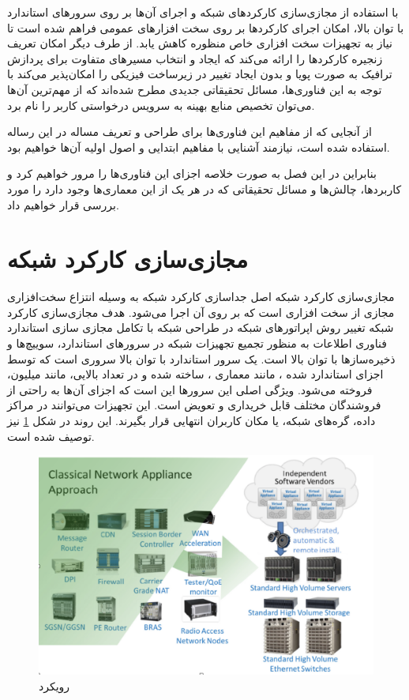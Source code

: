 با استفاده از مجازی‌سازی کارکردهای شبکه و اجرای آن‌ها بر روی سرورهای استاندارد با توان بالا،
امکان اجرای کارکردها بر روی سخت افزارهای عمومی فراهم شده است تا نیاز به تجهیزات سخت افزاری خاص منظوره کاهش یابد.
از طرف دیگر  امکان تعریف زنجیره کارکردها را ارائه می‌کند که ایجاد
و انتخاب مسیرهای متفاوت برای پردازش ترافیک به صورت پویا و بدون ایجاد تغییر در زیرساخت فیزیکی را امکان‌پذیر می‌کند
با توجه به این فناوری‌ها، مسائل تحقیقاتی جدیدی مطرح شده‌اند که از مهم‌ترین آن‌ها می‌توان تخصیص منابع بهینه به سرویس درخواستی کاربر را نام برد.

از آنجایی که از مفاهیم این فناور‌ی‌ها برای طراحی و تعریف مساله در این رساله استفاده شده است، نیازمند آشنایی با مفاهیم ابتدایی و اصول اولیه آن‌ها خواهیم بود.

بنابراین در این فصل به صورت خلاصه اجزای این فناوری‌ها را مرور خواهیم کرد و کاربردها، چالش‌ها و مسائل تحقیقاتی که در هر یک از این معماری‌ها وجود دارد را مورد بررسی قرار خواهیم داد.

\section{مجازی‌سازی کارکرد شبکه}

مجازی‌سازی کارکرد شبکه اصل جداسازی کارکرد شبکه به وسیله انتزاع سخت‌افزاری مجازی از سخت افزاری است که بر روی آن اجرا می‌شود.
هدف مجازی‌سازی کارکرد شبکه تغییر روش اپراتورهای شبکه در طراحی شبکه
با تکامل مجازی سازی استاندارد فناوری اطلاعات به منظور تجمیع تجهیزات شبکه
در سرورهای استاندارد، سوییچ‌ها و ذخیره‌سازها با توان بالا است.
یک سرور استاندارد با توان بالا سروری است که توسط اجزای استاندارد شده ،
مانند معماری ، ساخته شده و
در تعداد بالایی، مانند میلیون،
فروخته می‌شود.
ویژگی اصلی این سرورها این است که اجزای آن‌ها به راحتی از فروشندگان مختلف قابل خریداری و
تعویض است.
این تجهیزات می‌توانند در مراکز داده، گره‌های شبکه، یا مکان کاربران انتهایی قرار بگیرند.
این روند در
شکل
\ref{fig.6}
نیز توصیف شده است.

\begin{figure}[!h]
\center\includegraphics[scale=.5]{images/nfv-concept}
\caption{رویکرد }\label{fig.6}
\end{figure}


